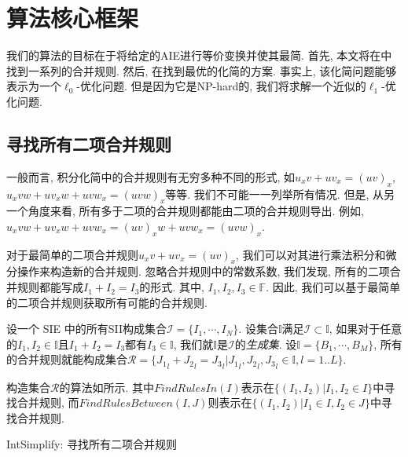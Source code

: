 \section{算法核心框架} \label{Simplify-03}
我们的算法的目标在于将给定的AIE进行等价变换并使其最简. 首先, 本文将在中找到一系列的合并规则. 然后, 在找到最优的化简的方案. 事实上, 该化简问题能够表示为一个$\ell_0$-优化问题. 但是因为它是NP-hard的, 我们将求解一个近似的$\ell_1$-优化问题. 


\subsection{寻找所有二项合并规则}\label{all_rules-03}
一般而言, 积分化简中的合并规则有无穷多种不同的形式, 如$u_x v + u v_x = (uv)_x$, $u_x v w+u v_x w + u v w_x = (uvw)_x$等等. 我们不可能一一列举所有情况. 但是, 从另一个角度来看, 所有多于二项的合并规则都能由二项的合并规则导出. 例如, $u_xvw+uv_xw+uvw_x=(uv)_xw+uvw_x=(uvw)_x$. 

对于最简单的二项合并规则$u_x v + u v_x = (uv)_x$, 我们可以对其进行乘法\D 积分和微分操作来构造新的合并规则. 忽略合并规则中的常数系数, 我们发现, 所有的二项合并规则都能写成$I_1+I_2=I_3$的形式. 其中, $I_1,I_2,I_3\in \mathbb F$. 因此, 我们可以基于最简单的二项合并规则获取所有可能的合并规则. 

设一个 SIE 中的所有SII构成集合$\mathcal I =\{I_1,\cdots,I_N\}$. 设集合$\mathbb I$满足$\mathcal I \subset \mathbb I$, 如果对于任意的$I_1,I_2\in \mathbb I$且$I_1+I_2=I_3$都有$I_3\in \mathbb I$, 我们就$\mathbb I$是$\mathcal I$的\emph{生成集}. 设$\mathbb I=\{B_1,\cdots,B_M\}$, 所有的合并规则就能构成集合$\mathcal R=\{{J_1}_l+{J_2}_l={J_3}_l|{J_1}_l,{J_2}_l,{J_3}_l \in \mathbb I, l=1..L\}$.

构造集合$\mathcal R$的算法如所示. 其中$FindRulesIn(I)$表示在$\{(I_1,I_2)|I_1, I_2 \in I\}$中寻找合并规则, 而$FindRulesBetween(I,J)$则表示在$\{(I_1,I_2)|I_1\in I, I_2 \in J\}$中寻找合并规则. 

\begin{algorithm}
\caption{IntSimplify: 寻找所有二项合并规则}
\label{FindAllRules}
\end{algorithm}

